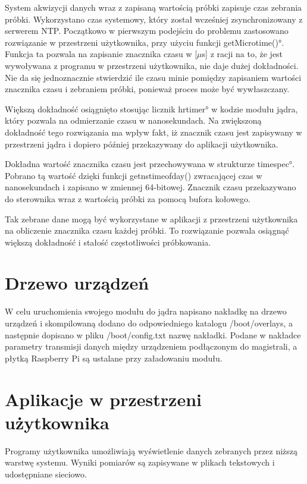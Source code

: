 System akwizycji danych wraz z zapisaną wartością próbki zapisuje czas zebrania próbki. Wykorzystano czas systemowy, który został wcześniej zsynchronizowany z serwerem NTP.
Początkowo w pierwszym podejściu do problemu zastosowano rozwiązanie w przestrzeni użytkownika, przy użyciu funkcji \ang{getMicrotime()}. Funkcja ta pozwala na zapisanie znacznika czasu w [$\mu$s] z racji na to, że jest wywoływana z programu w przestrzeni użytkownika, nie daje dużej dokładności. Nie da się jednoznacznie stwierdzić ile czasu minie pomiędzy zapisaniem wartości znacznika czasu i zebraniem próbki, ponieważ proces może być wywłaszczany.

Większą dokładność osiągnięto stosując licznik \ang{hrtimer} w kodzie modułu jądra, który pozwala na odmierzanie czasu w nanosekundach. Na zwiększoną dokładność tego rozwiązania ma wpływ fakt, iż znacznik czasu jest zapisywany w przestrzeni jądra i dopiero później przekazywany do aplikacji użytkownika.

Dokładna wartość znacznika czasu jest przechowywana w strukturze \ang{timespec}. Pobrano tą wartość dzięki funkcji getnstimeofday() zwracającej czas w nanosekundach i zapisano w zmiennej 64-bitowej. Znacznik czasu przekazywano do sterownika wraz z wartością próbki za pomocą bufora kołowego.


Tak zebrane dane mogą być wykorzystane w aplikacji z przestrzeni użytkownika na obliczenie znacznika czasu każdej próbki. To rozwiązanie pozwala osiągnąć większą dokładność i stałość częstotliwości próbkowania.


\section{Drzewo urządzeń}
W celu uruchomienia swojego modułu do jądra napisano nakładkę na drzewo urządzeń i skompilowaną dodano do odpowiedniego katalogu /boot/overlays, a następnie dopisano w pliku /boot/config.txt nazwę nakładki. Podane w nakładce parametry transmisji danych między urządzeniem podłączonym do magistrali, a płytką Raspberry Pi są ustalane przy załadowaniu modułu. 


\section{Aplikacje w przestrzeni użytkownika}

Programy użytkownika umożliwiają wyświetlenie danych zebranych przez niższą warstwę systemu. Wyniki pomiarów są zapisywane w plikach tekstowych i udostępniane sieciowo.

